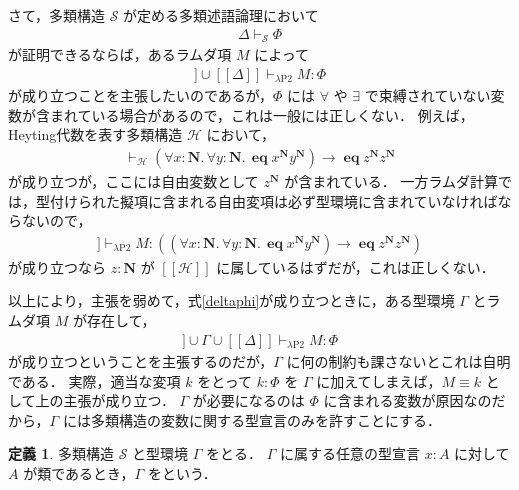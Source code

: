 \documentclass[./main]{subfiles}
\newcommand{\lam}{\lambda}
\newcommand{\bto}{\mathbin{\to}}
\newcommand{\ocl}{\mathord{:}}
\newcommand{\comb}[1]{\mathbf{#1}}
\newcommand{\combop}[1]{\mathop{\mathbf{#1}}\nolimits}
\newcommand{\textem}[1]{\textbf{\textgt{#1}}}
\newcommand{\mathscr}[1]{\mathcal{#1}}
\newcommand{\fl}[1]{}
\newcommand{\llbracket}{[\![}
\newcommand{\rrbracket}{]\!]}
\theoremstyle{definition}
\newtheorem{defi}[theo]{定義}
\begin{document}
さて，多類構造 $ \mathscr{S} $ が定める多類述語論理において
\begin{gather}
\varDelta \vdash _{\mathscr{S}} \varPhi \label{deltaphi}
\end{gather}
が証明できるならば，あるラムダ項 $ M $ によって
\begin{gather*}
\llbracket \mathscr{S} \rrbracket \cup \llbracket \varDelta \rrbracket \vdash _{\lam \mathrm{P2}} M \ocl\, \varPhi
\end{gather*}
が成り立つことを主張したいのであるが，$ \varPhi $ には $ \forall $ や $ \exists $ で束縛されていない変数が含まれている場合があるので，これは一般には正しくない．
例えば，Heyting代数を表す多類構造 $ \mathscr{H} $ において，
\begin{gather*}
\vdash _{\mathscr{H}} (\forall x \ocl\, \comb{N}.\, \forall y \ocl\, \comb{N}.\, \combop{eq} x ^{\comb{N}} y ^{\comb{N}}) \bto \combop{eq} z ^{\comb{N}} z ^{\comb{N}}
\end{gather*}
が成り立つが，ここには自由変数として $ z ^{\comb{N}} $ が含まれている．
一方ラムダ計算では，型付けられた擬項に含まれる自由変項は必ず型環境に含まれていなければならないので，
\begin{gather*}
\llbracket \mathscr{H} \rrbracket \vdash _{\lam \mathrm{P2}} M \ocl\, ((\forall x \ocl\, \comb{N}.\, \forall y \ocl\, \comb{N}.\, \combop{eq} x ^{\comb{N}} y ^{\comb{N}}) \bto \combop{eq} z ^{\comb{N}} z ^{\comb{N}})
\end{gather*}
が成り立つなら $ z \ocl\, \comb{N} $ が $ \llbracket \mathscr{H} \rrbracket $ に属しているはずだが，これは正しくない．

以上により，主張を弱めて，式\ref{deltaphi}が成り立つときに，ある型環境 $ \varGamma $ とラムダ項 $ M $ が存在して，
\begin{gather}
\llbracket \mathscr{S} \rrbracket \cup \varGamma \cup \llbracket \varDelta \rrbracket \vdash _{\lam \mathrm{P2}} M \ocl\, \varPhi \label{gammaphi}
\end{gather}
が成り立つということを主張するのだが，$ \varGamma $ に何の制約も課さないとこれは自明である．
実際，適当な変項 $ k $ をとって $ k \ocl\, \varPhi $ を $ \varGamma $ に加えてしまえば，$ M \equiv k $ として上の主張が成り立つ．
$ \varGamma $ が必要になるのは $ \varPhi $ に含まれる変数が原因なのだから，$ \varGamma $ には多類構造の変数に関する型宣言のみを許すことにする．

\begin{defi}
多類構造 $ \mathscr{S} $ と型環境 $ \varGamma $ をとる．
$ \varGamma $ に属する任意の型宣言 $ x \ocl\, A $ に対して $ A $ が類であるとき，$ \varGamma $ を\textem{変数環境\fl{variable context}}という．
\end{defi}
\end{document}
